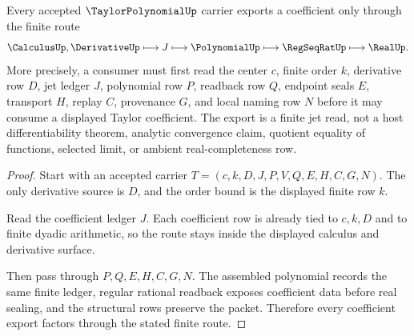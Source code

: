 \begin{theorem}
\label{thm:taylor-polynomial-jet-route}
Every accepted $\TaylorPolynomialUp$ carrier exports a coefficient only through the finite route
$$
\CalculusUp,\DerivativeUp \longmapsto J \longmapsto \PolynomialUp \longmapsto \RegSeqRatUp \longmapsto \RealUp .
$$
More precisely, a consumer must first read the center $c$, finite order $k$, derivative row $D$, jet ledger $J$, polynomial row $P$, readback row $Q$, endpoint seals $E$, transport $H$, replay $C$, provenance $G$, and local naming row $N$ before it may consume a displayed Taylor coefficient. The export is a finite jet read, not a host differentiability theorem, analytic convergence claim, quotient equality of functions, selected limit, or ambient real-completeness row.
\end{theorem}
\begin{proof}
Start with an accepted carrier $T=(c,k,D,J,P,V,Q,E,H,C,G,N)$. The only derivative source is $D$, and the order bound is the displayed finite row $k$.

Read the coefficient ledger $J$. Each coefficient row is already tied to $c,k,D$ and to finite dyadic arithmetic, so the route stays inside the displayed calculus and derivative surface.

Then pass through $P,Q,E,H,C,G,N$. The assembled polynomial records the same finite ledger, regular rational readback exposes coefficient data before real sealing, and the structural rows preserve the packet. Therefore every coefficient export factors through the stated finite route.
\end{proof}

